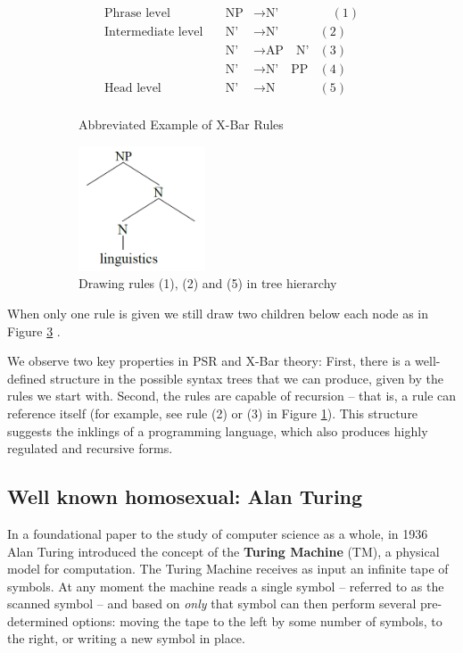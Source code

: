 \documentclass[runningheads]{llncs}
\begin{document}
\begin{figure}
	\centering
	\begin{subfigure}[b]{0.45\textwidth}
    \[
		\begin{array}{rllr}
			\text{Phrase level}\quad  &\text{NP}  &\rightarrow \text{N'}&\quad (1)\\
			\text{Intermediate level}\quad&\text{N'}  &\rightarrow \text{N'}&(2)\\
																		&\text{N'}  &\rightarrow \text{AP} \quad \text{N'}&(3)\\
																		&\text{N'}  &\rightarrow \text{N'} \quad \text{PP}&(4)\\
			\text{Head level}\quad&\text{N'}  &\rightarrow \text{N}&(5)\\
    \end{array}
	\]
    \caption{Abbreviated Example of X-Bar Rules}
		\label{fig:xbar}
	\end{subfigure}
	\begin{subfigure}[b]{0.45\textwidth}
		\centering
		\includegraphics[height=10em]{nouns}
		\caption{Drawing rules (1), (2) and (5) in tree hierarchy}
		\label{fig:nouns-img}
	\end{subfigure}
	\caption{}
\end{figure}
When only one rule is given we still draw two children below each node as in Figure \ref{fig:nouns-img} .

We observe two key properties in PSR and X-Bar theory: First, there is a well-defined structure in the possible syntax trees that we can produce, given by the rules we start with. Second, the rules are capable of recursion -- that is, a rule can reference itself (for example, see rule (2) or (3) in Figure \ref{fig:xbar}). This structure suggests the inklings of a programming language, which also produces highly regulated and recursive forms.
\subsection{Well known homosexual: Alan Turing}
In a foundational paper to the study of computer science as a whole, in 1936 Alan Turing introduced the concept of the \textbf{Turing Machine} (TM), a physical model for computation.\cite{turing1936}  The Turing Machine receives as input an infinite tape of symbols. At any moment the machine reads a single symbol -- referred to as the scanned symbol -- and based on \textit{only} that symbol can then perform several pre-determined options: moving the tape to the left by some number of symbols, to the right, or writing a new symbol in place.
\end{document}
